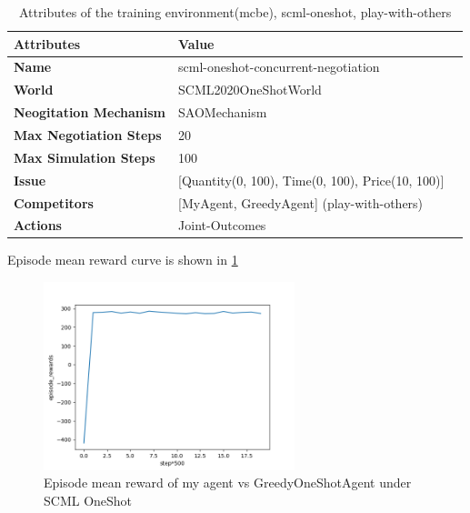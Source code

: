 \begin{table}[htbp]
\centering
\begin{tabular}{l l l} \toprule
\bfseries \textbf{Attributes}    & \bfseries \textbf{Value}                                             \\ \midrule
\textbf{Name}                    & scml-oneshot-concurrent-negotiation                                  \\
\textbf{World}                   & SCML2020OneShotWorld                                                 \\
\textbf{Neogitation Mechanism}   & SAOMechanism                                                         \\
\textbf{Max Negotiation Steps}   & 20                                                                  \\
\textbf{Max Simulation Steps}    & 100                                                                   \\
\textbf{Issue}             	     & [Quantity(0, 100), Time(0, 100), Price(10, 100)]                     \\
\textbf{Competitors}             & [MyAgent, GreedyAgent] (play-with-others)                                       \\
\textbf{Actions}                 & Joint-Outcomes                                                             \\
\bottomrule
\end{tabular}
\caption{Attributes of the training environment(mcbe), scml-oneshot, play-with-others}
\label{tab:attributes-mcbe-concurrent-negotiation-scml-oneshot-with-others}
\end{table}

Episode mean reward curve is shown in \ref{fig:oneshot-my-vs-greedy}

\begin{figure}[htbp]
\centering
\includegraphics[width=0.65\textwidth]{./images/oneshot_my_vs_greedy.png}
\caption{Episode mean reward of my agent vs GreedyOneShotAgent under SCML OneShot}
\label{fig:oneshot-my-vs-greedy}
\end{figure}

